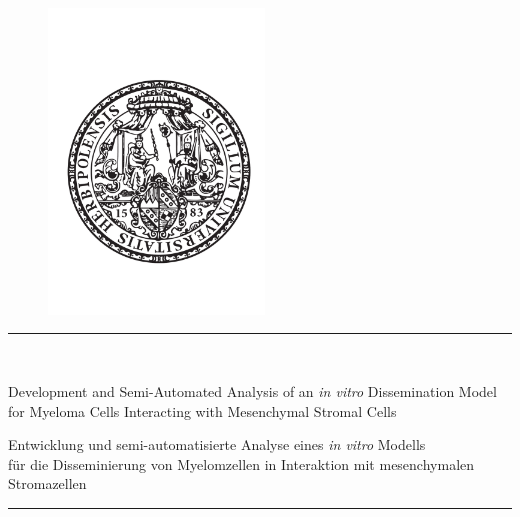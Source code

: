 



\begin{titlepage}
    \begin{center}

        \begin{figure}[H]
            \centering
            \includegraphics[width=2.26in]{FIGS/0_neuSIEGEL.pdf}
        \end{figure}


        \vspace{\vhalf}
        \rule{\textwidth}{0.4pt} \\ %
        \vspace{7pt} %

        Development and Semi-Automated Analysis of an \textit{in vitro} Dissemination Model \\
        for Myeloma Cells Interacting with Mesenchymal Stromal Cells
        \vspace{\vhalf}

        Entwicklung und semi-automatisierte Analyse eines \textit{in vitro} Modells \\
        für die Disseminierung von Myelomzellen in Interaktion mit mesenchymalen Stromazellen
        \rule{\textwidth}{0.4pt} %




\end{center}
\end{titlepage}

